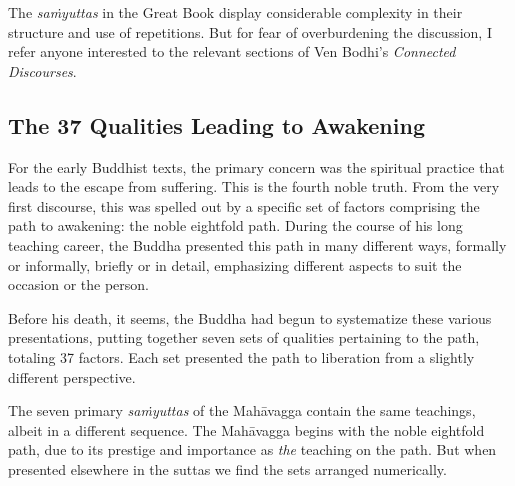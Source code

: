 \documentclass[12pt,openany]{book}%
\begin{document}
The \textit{\textsanskrit{saṁyuttas}} in the Great Book display considerable complexity in their structure and use of repetitions. But for fear of overburdening the discussion, I refer anyone interested to the relevant sections of Ven Bodhi’s \textit{Connected Discourses}.

\subsection*{The 37 Qualities Leading to Awakening}

For the early Buddhist texts, the primary concern was the spiritual practice that leads to the escape from suffering. This is the fourth noble truth. From the very first discourse, this was spelled out by a specific set of factors comprising the path to awakening: the noble eightfold path. During the course of his long teaching career, the Buddha presented this path in many different ways, formally or informally, briefly or in detail, emphasizing different aspects to suit the occasion or the person.

Before his death, it seems, the Buddha had begun to systematize these various presentations, putting together seven sets of qualities pertaining to the path, totaling 37 factors. Each set presented the path to liberation from a slightly different perspective.

The seven primary \textit{\textsanskrit{saṁyuttas}} of the \textsanskrit{Mahāvagga} contain the same teachings, albeit in a different sequence. The \textsanskrit{Mahāvagga} begins with the noble eightfold path, due to its prestige and importance as \emph{the} teaching on the path. But when presented elsewhere in the suttas we find the sets arranged numerically.
\end{document}
